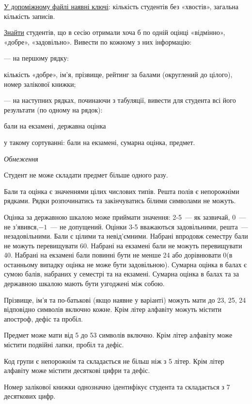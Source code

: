 \documentclass[11pt, ukrainian]{article}
\begin{document}
\underline{У допоміжному файлі наявні ключі}: кількість студентів без «хвостів», загальна кількість записів.

\underline{Знайти} студентів, що в сесію отримали хоча б по одній оцінці «відмінно», «добре», «задовільно». Вивести по кожному з них інформацію:\par
{\noindent}--- на першому рядку:\par
кількість «добре», ім’я, прізвище, рейтинг за балами (округлений до цілого), номер залікової книжки;

{\noindent}--- на наступних рядках, починаючи з табуляції, вивести для студента всі його результати (по одному на рядок):\par
бали на екзамені, державна оцінка

{\noindent}у такому сортуванні: бали на екзамені, сумарна оцінка, предмет.


\bigskip\textit{Обмеження}

Студент не може складати предмет більше одного разу.

Бали та оцінка є значеннями цілих числових типів. Решта полів є непорожніми рядками.
Рядки розпочинатись та закінчуватись білими символами не можуть.

Оцінка за державною шкалою може приймати значення: 2-5~--- як зазвичай, 0~--- не з’явився,$-1$~--- не допущений. 
Оцінки 3-5 вважаються задовільними, решта~--- незадовільними. 
Бали є цілими та невід’ємними.
Набрані впродовж семестру бали не можуть перевищувати 60. 
Набрані на екзамені бали не можуть перевищувати 40. 
Набрані на екзамені бали повинні бути не менше 24 або дорівнювати 0(в останньому випадку оцінка не може бути задовільною). 
Сумарна оцінка в балах є сумою балів, набраних у семестрі та на екзамені.
Сумарна оцінка в балах та за державною шкалою мають бути узгоджені між собою.

Прізвище, ім’я та по-батькові (якщо наявне у варіанті) можуть мати до 23, 25, 24 відповідно символів включно кожне. 
Крім літер алфавіту можуть містити апостроф, дефіс та пробіл.

Предмет може мати від 5 до 53 символів включно. 
Крім літер алфавіту може містити подвійні лапки, пробіл та дефіс.

Код групи є непорожнім та складається не більш ніж з 5 літер. 
Крім літер алфавіту може містити десяткові цифри та дефіс.


Номер залікової книжки однозначно ідентифікує студента та складається з 7 десяткових цифр. 
\end{document}
